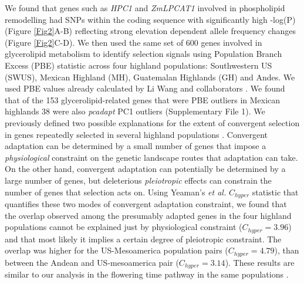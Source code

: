 \documentclass[9pt,twocolumn,twoside,lineno]{BioRxiv}
\begin{document}
We found that genes such as \textit{HPC1} and \textit{ZmLPCAT1} involved in phospholipid remodelling had SNPs within the coding sequence with significantly high -log(P) (Figure \ref{Fig2}A-B) reflecting strong elevation dependent allele frequency changes (Figure \ref{Fig2}C-D). 
We then used the same set of 600 genes involved in glycerolipid metabolism to identify selection signals using Population Branch Excess (PBE) \cite{Pool2017-oa} statistic across four highland populations: Southwestern US (SWUS), Mexican Highland (MH), Guatemalan Highlands (GH) and Andes. 
We used PBE values already calculated by Li Wang  and collaborators \cite{Wang2020-mp}.
We found that of the 153 glycerolipid-related genes that were PBE outliers in Mexican highlands 38 were also \textit{pcadapt} PC1 outliers (Supplementary File 1).
We previously defined two possible explanations for the extent of convergent selection in genes repeatedly selected in several highland populations \cite{Wang2020-mp, yeaman2018}. 
Convergent adaptation can be determined by a small number of genes that impose a \textit{physiological} constraint on the genetic landscape routes that adaptation can take. 
On the other hand, convergent adaptation can potentially be determined by a large number of genes, but deleterious \textit{pleiotropic} effects can constrain the number of genes that selection acts on.  
Using Yeaman's \textit{et al.} $C_{hyper}$ statistic \cite{yeaman2018} that quantifies these two modes of convergent adaptation constraint, we found that the overlap observed among the presumably adapted genes in the four highland populations cannot be explained just by physiological constraint ($C_{hyper} = 3.96$) and that most likely it implies a certain degree of pleiotropic constraint.
The overlap was higher for the US-Mesoamerica population pairs ($C_{hyper} = 4.79$), than between the Andean and US-mesoamerica pair ($C_{hyper} = 3.14$).
These results are similar to our analysis in the flowering time pathway in the same populations \cite{Wang2020-mp}.
\end{document}
